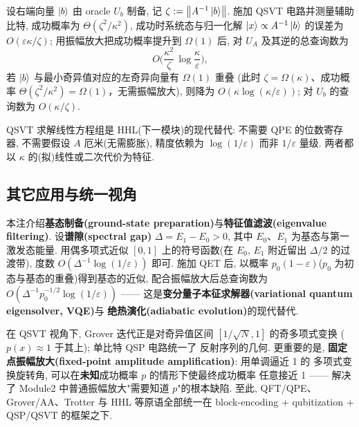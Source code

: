 \documentclass[utf8]{article} %
\numberwithin{equation}{section}   %
\newtheorem{Thm}{\hskip 2em {\color{blue} 定理}}[subsection]
\newtheorem{Note}{\hskip 2em {\color{red} 注}}[subsection]
\begin{document}
\begin{Thm}
    设右端向量 $\ket{b}$ 由 oracle $U_b$ 制备, 记
    $\zeta := \norm{A^{-1}\ket{b}}$. 施加 QSVT 电路并测量辅助比特,
    成功概率为 $\Theta(\zeta^2/\kappa^2)$, 成功时系统态与归一化解
    $\ket{x} \propto A^{-1}\ket{b}$ 的误差为 $O(\varepsilon \kappa/\zeta)$;
    用振幅放大把成功概率提升到 $\Omega(1)$ 后, 对 $U_A$ 及其逆的总查询数为
    \begin{equation}
        O\!\Big(\frac{\kappa^2}{\zeta}\,\log\frac{\kappa}{\varepsilon}\Big),
    \end{equation}
    若 $\ket{b}$ 与最小奇异值对应的左奇异向量有 $\Omega(1)$ 重叠
    (此时 $\zeta = \Omega(\kappa)$、成功概率 $\Theta(\zeta^2/\kappa^2)=\Omega(1)$，无需振幅放大), 则降为 $O(\kappa\log(\kappa/\varepsilon))$;
    对 $U_b$ 的查询数为 $O(\kappa/\zeta)$.
\end{Thm}

\begin{Note}
    QSVT 求解线性方程组是 HHL(下一模块)的现代替代: 不需要 QPE 的位数寄存器,
    不需要假设 $A$ 厄米(无需膨胀), 精度依赖为 $\log(1/\varepsilon)$ 而非
    $1/\varepsilon$ 量级. 两者都以 $\kappa$ 的(拟)线性或二次代价为特征.
\end{Note}

\subsection{其它应用与统一视角}

\begin{Note}[基态制备与特征值滤波]
    本注介绍\textbf{基态制备(ground-state preparation)}与\textbf{特征值滤波(eigenvalue filtering)}.
    设\textbf{谱隙(spectral gap)} $\Delta = E_1 - E_0 > 0$, 其中 $E_0$、$E_1$ 为基态与第一激发态能量.
    用偶多项式近似 $[0,1]$ 上的符号函数(在 $E_0$, $E_1$ 附近留出 $\Delta/2$ 的过渡带),
    度数 $O(\Delta^{-1}\log(1/\varepsilon))$ 即可. 施加 QET 后, 以概率
    $p_0(1-\varepsilon)$($p_0$ 为初态与基态的重叠)得到基态的近似,
    配合振幅放大后总查询数为
    $O(\Delta^{-1}p_0^{-1/2}\log(1/\varepsilon))$ —— 这是\textbf{变分量子本征求解器(variational quantum eigensolver, VQE)}与
    \textbf{绝热演化(adiabatic evolution)}的现代替代.
\end{Note}

\begin{Note}
    在 QSVT 视角下, Grover 迭代正是对奇异值区间 $[1/\sqrt{N}, 1]$ 的奇多项式变换
    ($p(x) \approx 1$ 于其上); 单比特 QSP 电路统一了
    反射序列的几何. 更重要的是, \textbf{固定点振幅放大(fixed-point amplitude amplification)}: 用单调逼近 1 的
    多项式变换旋转角, 可以在\textbf{未知}成功概率 $p$ 的情形下使最终成功概率
    任意接近 1 —— 解决了 Module2 中普通振幅放大"需要知道 $p$"的根本缺陷.
    至此, QFT/QPE、Grover/AA、Trotter 与 HHL 等原语全部统一在
    block-encoding + qubitization + QSP/QSVT 的框架之下.
\end{Note}
\end{document}
